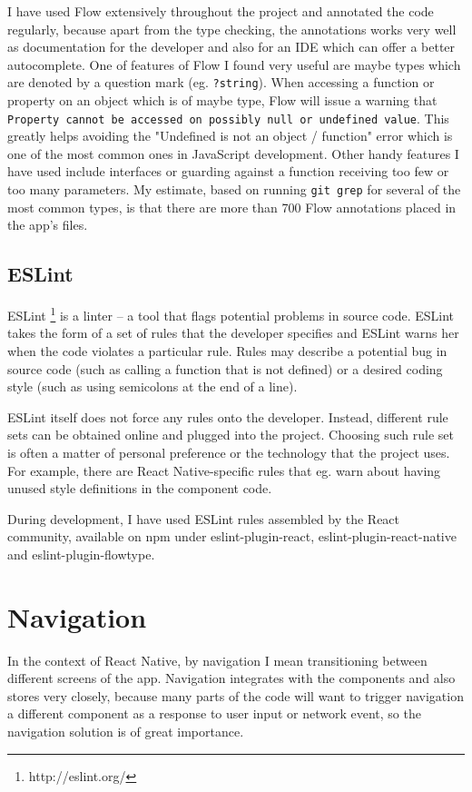 I have used Flow extensively throughout the project and annotated the code regularly, because apart from the type checking, the annotations works very well as documentation for the developer and also for an IDE which can offer a better autocomplete. One of features of Flow I found very useful are maybe types which are denoted by a question mark (eg. \texttt{?string}). When accessing a function or property on an object which is of maybe type, Flow will issue a warning that \texttt{Property cannot be accessed on possibly null or undefined value}. This greatly helps avoiding the "Undefined is not an object / function" error which is one of the most common ones in JavaScript development. Other handy features I have used include interfaces or guarding against a function receiving too few or too many parameters. My estimate, based on running \texttt{git grep} for several of the most common types, is that there are more than 700 Flow annotations placed in the app's files.

\subsection{ESLint}

ESLint  \footnote{http://eslint.org/} is a linter -- a tool that flags potential problems in source code. ESLint takes the form of a set of rules that the developer specifies and ESLint warns her when the code violates a particular rule. Rules may describe a potential bug in source code (such as calling a function that is not defined) or a desired coding style (such as using semicolons at the end of a line).

ESLint itself does not force any rules onto the developer. Instead, different rule sets can be obtained online and plugged into the project. Choosing such rule set is often a matter of personal preference or the technology that the project uses. For example, there are React Native-specific rules that eg. warn about having unused style definitions in the component code. 

During development, I have used ESLint rules assembled by the React community, available on npm under eslint-plugin-react, eslint-plugin-react-native and eslint-plugin-flowtype.


\section{Navigation}

In the context of React Native, by navigation I mean transitioning between different screens of the app. Navigation integrates with the components and also stores very closely, because many parts of the code will want to trigger navigation a different component as a response to user input or network event, so the navigation solution is of great importance. 

